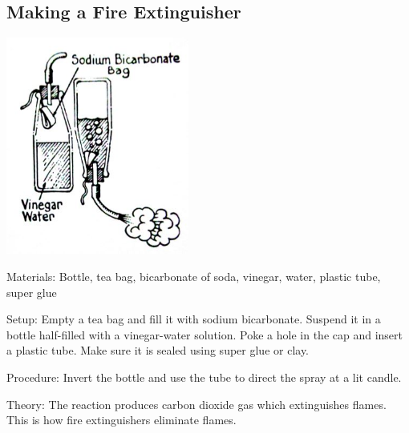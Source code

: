 \begin{multicols}{2}
\vfill
\columnbreak

\subsection{Making a Fire Extinguisher}

\begin{center}
\includegraphics[width=0.45\textwidth]{./img/fire-extinguisher.jpg}
\end{center}

\begin{description*}
\item[Materials:]{Bottle, tea bag, bicarbonate of soda, vinegar, water, plastic tube, super glue}
\item[Setup:]{Empty a tea bag and fill it with sodium bicarbonate. Suspend it in a bottle half-filled with a vinegar-water solution. Poke a hole in the cap and insert a plastic tube. Make sure it is sealed using super glue or clay.}
\item[Procedure:]{Invert the bottle and use the tube to direct the spray at a lit candle.}
\item[Theory:]{The reaction produces carbon dioxide gas which extinguishes flames. This is how fire extinguishers eliminate flames.}
\end{description*}

\vfill
\columnbreak



\end{multicols}

